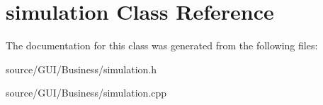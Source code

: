 \section{simulation Class Reference}
\label{classsimulation}


The documentation for this class was generated from the following files\+:\begin{DoxyCompactItemize}
\item 
source/\+G\+U\+I/\+Business/simulation.\+h\item 
source/\+G\+U\+I/\+Business/simulation.\+cpp\end{DoxyCompactItemize}
